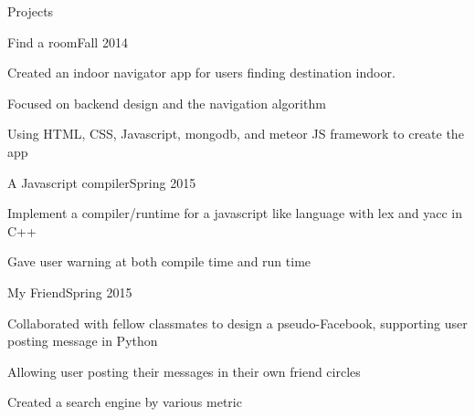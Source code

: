 \documentclass{resume} %
\begin{document}
\begin{rSection}{Projects}

\begin{rSubsection}{Find a room}{Fall 2014}{}{}
\item Created an indoor navigator app for users finding destination indoor.
\item Focused on backend design and the navigation algorithm
\item Using HTML, CSS, Javascript, mongodb, and meteor JS framework to create the app
\end{rSubsection}

\begin{rSubsection}{A Javascript compiler}{Spring 2015}{}{}
\item Implement a compiler/runtime for a javascript like language with lex and yacc in C++
\item Gave user warning at both compile time and run time
\end{rSubsection}

\begin{rSubsection}{My Friend}{Spring 2015}{}{}
\item Collaborated with fellow classmates to design a pseudo-Facebook, supporting user posting message in Python
\item Allowing user posting their messages in their own friend circles
\item Created a search engine by various metric
\end{rSubsection}









\end{rSection}
\end{document}
